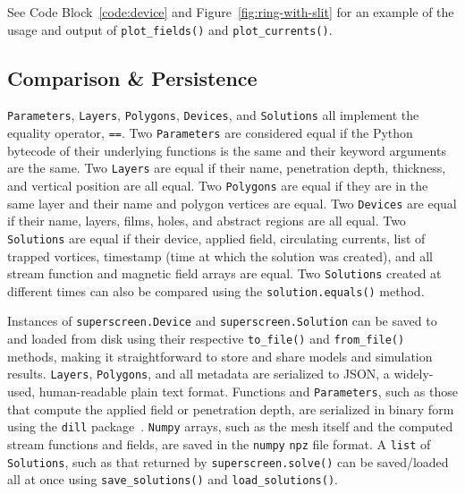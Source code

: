 \documentclass[final,3p,times]{elsarticle}
\newcommand{\inline}[1]{\texttt{#1}\xspace}
\begin{document}
See Code Block~\ref{code:device} and  Figure~\ref{fig:ring-with-slit} for an example of the usage and output of \inline{plot_fields()} and \inline{plot_currents()}.

\subsection{Comparison \& Persistence}
\label{section:overview:persistence}

\inline{Parameters}, \inline{Layers}, \inline{Polygons}, \inline{Devices}, and \inline{Solutions} all implement the equality operator, \inline{==}. Two \inline{Parameters} are considered equal if the Python bytecode of their underlying functions is the same and their keyword arguments are the same. Two \inline{Layers} are equal if their name, penetration depth, thickness, and vertical position are all equal. Two \inline{Polygons} are equal if they are in the same layer and their name and polygon vertices are equal. Two \inline{Devices} are equal if their name, layers, films, holes, and abstract regions are all equal. Two \inline{Solutions} are equal if their device, applied field, circulating currents, list of trapped vortices, timestamp (time at which the solution was created), and all stream function and magnetic field arrays are equal. Two \inline{Solutions} created at different times can also be compared using the  \inline{solution.equals()} method.

Instances of \inline{superscreen.Device} and \inline{superscreen.Solution} can be saved to and loaded from disk using their respective \inline{to_file()} and \inline{from_file()} methods, making it straightforward to store and share models and simulation results. \inline{Layers}, \inline{Polygons}, and all metadata are serialized to JSON, a widely-used, human-readable plain text format. Functions and \inline{Parameters}, such as those that compute the applied field or penetration depth, are serialized in binary form using the \inline{dill} package~\cite{McKerns}. \inline{Numpy} arrays, such as the mesh itself and the computed stream functions and fields, are saved in the \inline{numpy} \inline{npz} file format. A \inline{list} of \inline{Solutions}, such as that returned by \inline{superscreen.solve()} can be saved/loaded all at once using \inline{save_solutions()} and \inline{load_solutions()}.
\end{document}
